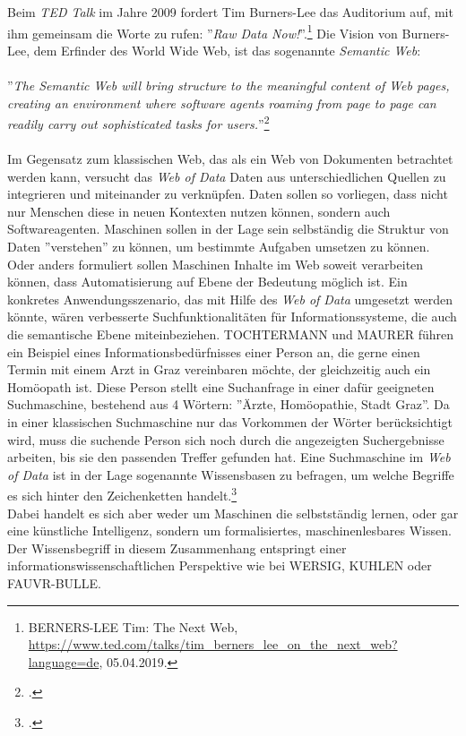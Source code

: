 \documentclass[12pt,a4paper]{article}
\begin{document}
Beim \textit{TED Talk} im Jahre 2009 fordert Tim Burners-Lee das Auditorium auf, mit ihm gemeinsam die Worte zu rufen: ''\textit{Raw Data Now!}''.\footnote{BERNERS-LEE Tim: The Next Web, \url{https://www.ted.com/talks/tim_berners_lee_on_the_next_web?language=de}, 05.04.2019.} Die Vision von Burners-Lee, dem Erfinder des World Wide Web, ist das sogenannte \textit{Semantic Web}:
\\
\\
''\textit{The Semantic Web will bring structure to the meaningful content of Web pages, creating an environment where software agents roaming from page to page can readily carry out sophisticated tasks for users.}''\footcite[][S.3]{berners2001semantic}
\\
\\
Im Gegensatz zum klassischen Web, das als ein Web von Dokumenten betrachtet werden kann, versucht das \textit{Web of Data} Daten aus unterschiedlichen Quellen zu integrieren und miteinander zu verknüpfen. Daten sollen so vorliegen, dass nicht nur Menschen diese in neuen Kontexten nutzen können, sondern auch Softwareagenten. Maschinen sollen in der Lage sein selbständig die Struktur von Daten ''verstehen'' zu können, um bestimmte Aufgaben umsetzen zu können. Oder anders formuliert sollen Maschinen Inhalte im Web soweit verarbeiten können, dass Automatisierung auf Ebene der Bedeutung möglich ist. Ein konkretes Anwendungsszenario, das mit Hilfe des \textit{Web of Data} umgesetzt werden könnte, wären verbesserte Suchfunktionalitäten für Informationssysteme, die auch die semantische Ebene miteinbeziehen. TOCHTERMANN und MAURER führen ein Beispiel eines Informationsbedürfnisses einer Person an, die gerne einen Termin mit einem Arzt in Graz vereinbaren möchte, der gleichzeitig auch ein Homöopath ist. Diese Person stellt eine Suchanfrage in einer dafür geeigneten Suchmaschine, bestehend aus 4 Wörtern: ''Ärzte, Homöopathie, Stadt Graz''. Da in einer klassischen Suchmaschine nur das Vorkommen der Wörter berücksichtigt wird, muss die suchende Person sich noch durch die angezeigten Suchergebnisse arbeiten, bis sie den passenden Treffer gefunden hat. Eine Suchmaschine im \textit{Web of Data} ist in der Lage sogenannte Wissensbasen zu befragen, um welche Begriffe es sich hinter den Zeichenketten handelt.\footcite[S.1-2]{pellegrini2006semantic} 
\\
 Dabei handelt es sich aber weder um Maschinen die selbstständig lernen, oder gar eine künstliche Intelligenz, sondern um formalisiertes, maschinenlesbares Wissen. Der Wissensbegriff in diesem Zusammenhang entspringt einer informationswissenschaftlichen Perspektive wie bei WERSIG, KUHLEN oder FAUVR-BULLE.
\end{document}
